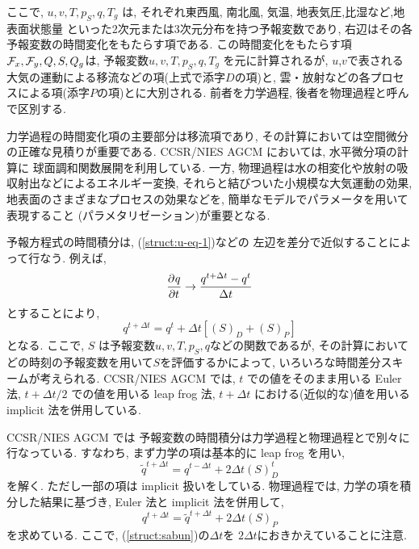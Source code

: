 ここで, $u,v,T,p_S,q,T_g$ は, 
それぞれ東西風, 南北風, 気温, 地表気圧,比湿など,地表面状態量
といった2次元または3次元分布を持つ予報変数であり,
右辺はその各予報変数の時間変化をもたらす項である.
この時間変化をもたらす項${\cal F}_x,{\cal F}_y,Q,S,Q_g$は,  
予報変数$u,v,T,p_S,q,T_g$ を元に計算されるが,
$u$,$v$で表される大気の運動による移流などの項(上式で添字$D$の項)と,
雲・放射などの各プロセスによる項(添字$P$の項)とに大別される.
前者を力学過程, 後者を物理過程と呼んで区別する.

力学過程の時間変化項の主要部分は移流項であり,
その計算においては空間微分の正確な見積りが重要である.
CCSR/NIES AGCM においては, 水平微分項の計算に
球面調和関数展開を利用している.
一方, 物理過程は水の相変化や放射の吸収射出などによるエネルギー変換, 
それらと結びついた小規模な大気運動の効果, 
地表面のさまざまなプロセスの効果などを, 
簡単なモデルでパラメータを用いて表現すること
(パラメタリゼーション)が重要となる.

予報方程式の時間積分は,
(\ref{struct:u-eq-1})などの
左辺を差分で近似することによって行なう. 例えば,
%
\begin{equation}
  \DP{q}{t} \rightarrow \frac{q^{t+\Delta t} - q^{t}}{\Delta t}
\end{equation}
%
とすることにより, 
\begin{equation}
  q^{t+\Delta t} = q^{t} 
       + \Delta t \left[ \left( S \right)_D + \left( S \right)_P  \right]
  \label{struct:sabun}
\end{equation}
となる. 
ここで, $S$ は予報変数$u,v,T,p_S,q$などの関数であるが,
その計算においてどの時刻の予報変数を用いて$S$を評価するかによって,
いろいろな時間差分スキームが考えられる.
CCSR/NIES AGCM では, 
$t$ での値をそのまま用いる Euler 法,
$t+\Delta t/2$ での値を用いる leap frog 法, 
$t+\Delta t$ における(近似的な)値を用いる implicit 法を併用している.

CCSR/NIES AGCM では
予報変数の時間積分は力学過程と物理過程とで別々に行なっている.
すなわち, まず力学の項は基本的に leap frog を用い,
\begin{equation}
  \tilde{q}^{t+\Delta t} = q^{t-\Delta t} + 2 \Delta t \left( S \right)_D^{t}
\end{equation}
を解く. ただし一部の項は implicit 扱いをしている.
物理過程では,
力学の項を積分した結果に基づき, 
Euler 法と implicit 法を併用して,
\begin{equation}
  q^{t+\Delta t} = \tilde{q}^{t+\Delta t} + 2 \Delta t \left( S \right)_P
\end{equation}
を求めている. 
ここで, (\ref{struct:sabun})の$\Delta t$を
$2 \Delta t$におきかえていることに注意.

